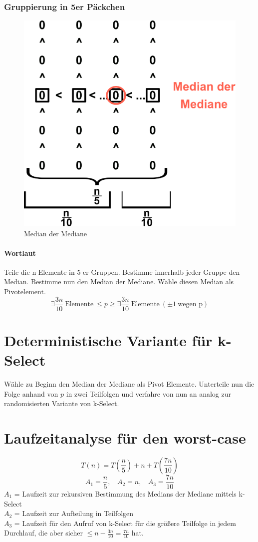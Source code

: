 \subsubsection*{Gruppierung in 5er Päckchen}
\begin{figure}
\vspace{-40pt}
\centering
\includegraphics[width=0.6\linewidth]{08/Grafik/img1.png}
\caption{Median der Mediane}
\end{figure}

\vspace{20pt}
\paragraph{Wortlaut}
Teile die n Elemente in 5-er Gruppen. Bestimme innerhalb jeder Gruppe den Median. Bestimme nun den Median der Mediane. Wähle diesen Median als Pivotelement.
\[\exists \frac{3n}{10}~\text{Elemente}~\leq p \geq \exists \frac{3n}{10}~\text{Elemente}~(\pm 1~\text{wegen p})\]
\vspace{1pt}




\section{Deterministische Variante für k-Select}
Wähle zu Beginn den Median der Mediane als Pivot Elemente. Unterteile nun die Folge anhand von $p$ in zwei Teilfolgen und verfahre von nun an analog zur randomisierten Variante von k-Select.

\section{Laufzeitanalyse für den worst-case}
\[T(n) = T\left(\frac{n}{5}\right)+n+T \left(\frac{7n}{10} \right) \]
\[A_1 = \frac{n}{5},~~~~A_2 = n,~~~~A_3= \frac{7n}{10}\]
$A_1$ = Laufzeit zur rekursiven Bestimmung des Medians der Mediane mittels k-Select\\
$A_2$ = Laufzeit zur Aufteilung in Teilfolgen\\
$A_3$ = Laufzeit für den Aufruf von k-Select  für die größere Teilfolge in jedem Durchlauf, die aber sicher $\leq n - \frac{3n}{10} = \frac{7n}{10}$ hat.\\

